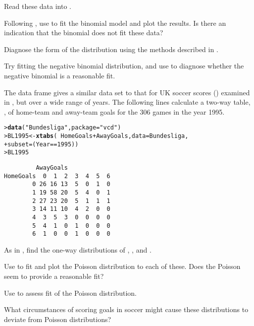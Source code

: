 \documentclass[11pt]{report}\usepackage[]{graphicx}\usepackage[]{color}
\makeatletter
\newcommand{\hlnum}[1]{\textcolor[rgb]{0.686,0.059,0.569}{#1}}%
\newcommand{\hlstr}[1]{\textcolor[rgb]{0.192,0.494,0.8}{#1}}%
\newcommand{\hlopt}[1]{\textcolor[rgb]{0,0,0}{#1}}%
\newcommand{\hlstd}[1]{\textcolor[rgb]{0.345,0.345,0.345}{#1}}%
\newcommand{\hlkwb}[1]{\textcolor[rgb]{0.69,0.353,0.396}{#1}}%
\newcommand{\hlkwc}[1]{\textcolor[rgb]{0.333,0.667,0.333}{#1}}%
\newcommand{\hlkwd}[1]{\textcolor[rgb]{0.737,0.353,0.396}{\textbf{#1}}}%
\newenvironment{kframe}{%
 \def\at@end@of@kframe{}%
 \ifinner\ifhmode%
  \def\at@end@of@kframe{\end{minipage}}%
  \begin{minipage}{\columnwidth}%
 \fi\fi%
 \def\FrameCommand##1{\hskip\@totalleftmargin \hskip-\fboxsep
 \colorbox{shadecolor}{##1}\hskip-\fboxsep
     \hskip-\linewidth \hskip-\@totalleftmargin \hskip\columnwidth}%
 \MakeFramed {\advance\hsize-\width
   \@totalleftmargin\z@ \linewidth\hsize
   \@setminipage}}%
 {\par\unskip\endMakeFramed%
 \at@end@of@kframe}
\newenvironment{knitrout}{}{} %
\renewenvironment{knitrout}{\small\renewcommand{\baselinestretch}{.85}}{} %
\makeatother
\begin{document}
\begin{Exercises}
  \begin{enumerate*}
    \item Read these data into \R.
    \item Following , use  to fit the binomial model and plot the
    results.  Is there an indication that the binomial does not fit these data?
    \item Diagnose the form of the distribution using the methods described in .
    \item Try fitting the negative binomial distribution, and use  to diagnose
    whether the negative binomial is a reasonable fit.
  \end{enumerate*}

  \exercise The data frame  gives a similar data set to that for UK soccer scores
  ()
  examined in , but over a wide range of years.  The following lines calculate
  a two-way table, , of home-team and away-team goals
  for the 306 games in the year 1995.
\begin{knitrout}
\color{fgcolor}\begin{kframe}
\begin{alltt}
\hlstd{> }\hlkwd{data}\hlstd{(}\hlstr{"Bundesliga"}\hlstd{,} \hlkwc{package} \hlstd{=} \hlstr{"vcd"}\hlstd{)}
\hlstd{> }\hlstd{BL1995} \hlkwb{<-} \hlkwd{xtabs}\hlstd{(}\hlopt{~} \hlstd{HomeGoals} \hlopt{+} \hlstd{AwayGoals,} \hlkwc{data} \hlstd{= Bundesliga,}
\hlstd{+ }                \hlkwc{subset} \hlstd{= (Year} \hlopt{==} \hlnum{1995}\hlstd{))}
\hlstd{> }\hlstd{BL1995}
\end{alltt}
\begin{verbatim}
         AwayGoals
HomeGoals  0  1  2  3  4  5  6
        0 26 16 13  5  0  1  0
        1 19 58 20  5  4  0  1
        2 27 23 20  5  1  1  1
        3 14 11 10  4  2  0  0
        4  3  5  3  0  0  0  0
        5  4  1  0  1  0  0  0
        6  1  0  0  1  0  0  0
\end{verbatim}
\end{kframe}
\end{knitrout}
  \begin{enumerate*}
    \begin{sloppypar}
    \item As in , find the one-way distributions of ,
    , and .
    \end{sloppypar}
    \item Use  to fit and plot the Poisson distribution to each of these.  Does the
    Poisson seem to provide a reasonable fit?
    \item Use  to assess fit of the Poisson distribution.
    \item What circumstances of scoring goals in soccer might cause these distributions to
    deviate from Poisson distributions?
  \end{enumerate*}


\end{Exercises}
\end{document}
